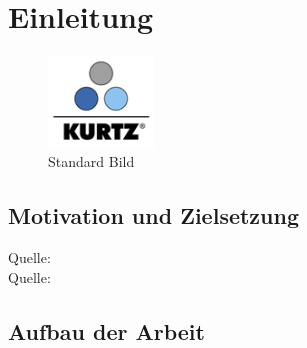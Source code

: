 \section{Einleitung}

	\begin{figure}[h!]
	\centering
		\includegraphics[width=0.25\textwidth]{Pics/Kurtz.png}
	\caption{Standard Bild}
	\label{fig:stani}
	\end{figure}





\subsection{Motivation und Zielsetzung}

Quelle: \cite{labview-buch01} \\
Quelle: \cite{internet}


\subsection{Aufbau der Arbeit}






